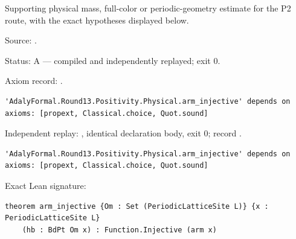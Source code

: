 \begin{theorem}[bp-489]
\label{bp-489}
\leanok
Supporting physical mass, full-color or periodic-geometry estimate for the P2 route, with the exact hypotheses displayed below.

\par Source: \texttt{}.
\par Status: A — compiled and independently replayed; exit 0.
\par Axiom record: \texttt{}.
\begin{verbatim}
'AdalyFormal.Round13.Positivity.Physical.arm_injective' depends on axioms: [propext, Classical.choice, Quot.sound]
\end{verbatim}
\par Independent replay: \texttt{}, identical declaration body, exit 0; record \texttt{}.
\begin{verbatim}
'AdalyFormal.Round13.Positivity.Physical.arm_injective' depends on axioms: [propext, Classical.choice, Quot.sound]
\end{verbatim}
\par Exact Lean signature:
\begin{verbatim}
theorem arm_injective {Om : Set (PeriodicLatticeSite L)} {x : PeriodicLatticeSite L}
    (hb : BdPt Om x) : Function.Injective (arm x)
\end{verbatim}
\end{theorem}

